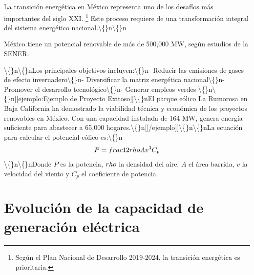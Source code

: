\documentclass{sener2025}
\begin{document}
La transición energética en México representa uno de los desafíos más importantes del siglo XXI. \footnote{Según el Plan Nacional de Desarrollo 2019-2024, la transición energética es prioritaria.} Este proceso requiere de una transformación integral del sistema energético nacional.\textbackslash\{\}n\textbackslash\{\}n\begin{destacado}
México tiene un potencial renovable de más de 500,000 MW, según estudios de la SENER.
\end{destacado}\textbackslash\{\}n\textbackslash\{\}nLos principales objetivos incluyen:\textbackslash\{\}n- Reducir las emisiones de gases de efecto invernadero\textbackslash\{\}n- Diversificar la matriz energética nacional\textbackslash\{\}n- Promover el desarrollo tecnológico\textbackslash\{\}n- Generar empleos verdes \cite{sener2024_empleos}\textbackslash\{\}n\textbackslash\{\}n[[ejemplo:Ejemplo de Proyecto Exitoso]]\textbackslash\{\}nEl parque eólico La Rumorosa en Baja California ha demostrado la viabilidad técnica y económica de los proyectos renovables en México. Con una capacidad instalada de 164 MW, genera energía suficiente para abastecer a 65,000 hogares.\textbackslash\{\}n[[/ejemplo]]\textbackslash\{\}n\textbackslash\{\}nLa ecuación para calcular el potencial eólico es:\textbackslash\{\}n\begin{equation}
P =\\frac{1}{2} \\rho A v^3 C_p
\end{equation}\textbackslash\{\}n\textbackslash\{\}nDonde $P$ es la potencia, $\\rho$ la densidad del aire, $A$ el área barrida, $v$ la velocidad del viento y $C_p$ el coeficiente de potencia.


\section{Evolución de la capacidad de generación eléctrica}
\end{document}
